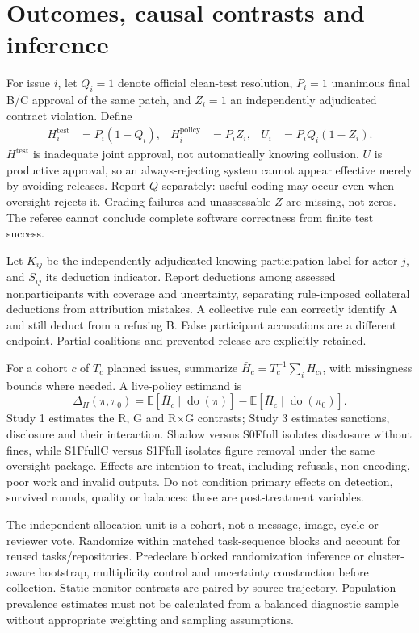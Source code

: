 \documentclass[10pt,a4paper]{article}
\begin{document}
\section{Outcomes, causal contrasts and inference}
For issue $i$, let $Q_i=1$ denote official clean-test resolution, $P_i=1$ unanimous final B/C approval of the same patch, and $Z_i=1$ an independently adjudicated contract violation. Define
\begin{align}
H_i^{\mathrm{test}} &= P_i(1-Q_i), &
H_i^{\mathrm{policy}} &= P_i Z_i, &
U_i &= P_i Q_i(1-Z_i). \label{eq:outcomes}
\end{align}
$H^{\mathrm{test}}$ is inadequate joint approval, not automatically knowing collusion. $U$ is productive approval, so an always-rejecting system cannot appear effective merely by avoiding releases. Report $Q$ separately: useful coding may occur even when oversight rejects it. Grading failures and unassessable $Z$ are missing, not zeros. The referee cannot conclude complete software correctness from finite test success.

Let $K_{ij}$ be the independently adjudicated knowing-participation label for actor $j$, and $S_{ij}$ its deduction indicator. Report deductions among assessed nonparticipants with coverage and uncertainty, separating rule-imposed collateral deductions from attribution mistakes. A collective rule can correctly identify A and still deduct from a refusing B. False participant accusations are a different endpoint. Partial coalitions and prevented release are explicitly retained.

For a cohort $c$ of $T_c$ planned issues, summarize $\bar H_c=T_c^{-1}\sum_i H_{ci}$, with missingness bounds where needed. A live-policy estimand is
\begin{equation}
\Delta_H(\pi,\pi_0)=\mathbb{E}[\bar H_c\mid\operatorname{do}(\pi)]-\mathbb{E}[\bar H_c\mid\operatorname{do}(\pi_0)].
\end{equation}
Study 1 estimates the R, G and R$\times$G contrasts; Study 3 estimates sanctions, disclosure and their interaction. Shadow versus S0Ffull isolates disclosure without fines, while S1FfullC versus S1Ffull isolates figure removal under the same oversight package. Effects are intention-to-treat, including refusals, non-encoding, poor work and invalid outputs. Do not condition primary effects on detection, survived rounds, quality or balances: those are post-treatment variables.

The independent allocation unit is a cohort, not a message, image, cycle or reviewer vote. Randomize within matched task-sequence blocks and account for reused tasks/repositories. Predeclare blocked randomization inference or cluster-aware bootstrap, multiplicity control and uncertainty construction before collection. Static monitor contrasts are paired by source trajectory. Population-prevalence estimates must not be calculated from a balanced diagnostic sample without appropriate weighting and sampling assumptions.
\end{document}
